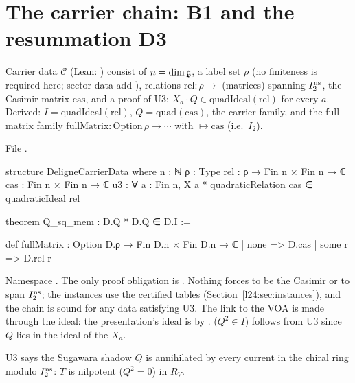 \section{The carrier chain: B1 and the resummation D3}\label{l24:sec:chain}

\begin{definition}\label{l24:def:carrierdata}
Carrier data $\mathscr C$ (Lean: ) consist of $n=\dim\mathfrak g$, a label set $\rho$ (no finiteness is required here; sector data add
), relations $\mathrm{rel}:\rho\to$ (matrices) spanning
$I_2^{\mathrm{ns}}$, the Casimir matrix $\mathrm{cas}$, and a proof of U3: $X_a\cdot Q\in\mathrm{quadIdeal}(\mathrm{rel})$ for every
$a$. Derived: $I=\mathrm{quadIdeal}(\mathrm{rel})$, $Q=\mathrm{quad}(\mathrm{cas})$, the carrier family, and the full
matrix family $\mathrm{fullMatrix}:\mathrm{Option}\,\rho\to\cdots$ with $\mapsto\mathrm{cas}$ (i.e.\ $I_2$).
\end{definition}
\noindent File .
\begin{leancode}
structure DeligneCarrierData where
  n : ℕ
  ρ : Type
  rel : ρ → Fin n × Fin n → ℂ
  cas : Fin n × Fin n → ℂ
  u3 : ∀ a : Fin n, X a * quadraticRelation cas ∈ quadraticIdeal rel

theorem Q_sq_mem : D.Q * D.Q ∈ D.I :=

def fullMatrix : Option D.ρ → Fin D.n × Fin D.n → ℂ
  | none => D.cas
  | some r => D.rel r
\end{leancode}

\begin{dictionary}
Namespace . The only proof obligation is . Nothing forces
 to be the Casimir or  to span $I_2^{\mathrm{ns}}$; the instances use the certified tables
(Section~\ref{l24:sec:instances}), and the chain is sound for any data satisfying U3. The link to the VOA is
made through the ideal: the presentation's ideal is  by .  ($Q^2\in I$)
follows from U3 since $Q$ lies in the ideal of the $X_a$.
\end{dictionary}

\begin{physics}
U3 says the Sugawara shadow $Q$ is annihilated by every current in the chiral ring modulo $I_2^{\mathrm{ns}}$:
$T$ is nilpotent ($Q^2=0$) in $R_V$.
\end{physics}

